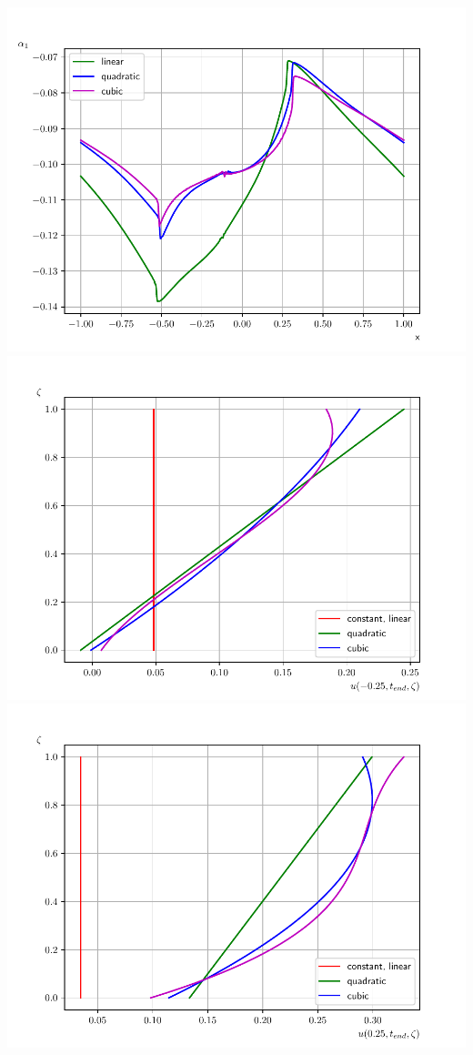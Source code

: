   \includegraphics{Figures/alpha_1_torrilhon.pdf}
  \includegraphics{Figures/velocity_profile_-025_torrilhon.pdf}
  \includegraphics{Figures/velocity_profile_025_torrilhon.pdf}

